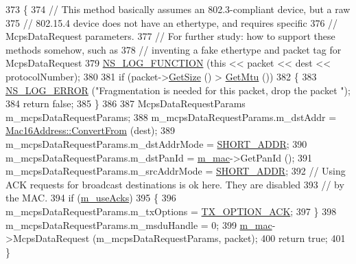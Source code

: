 \begin{DoxyCode}
373 \{
374   \textcolor{comment}{// This method basically assumes an 802.3-compliant device, but a raw}
375   \textcolor{comment}{// 802.15.4 device does not have an ethertype, and requires specific}
376   \textcolor{comment}{// McpsDataRequest parameters.}
377   \textcolor{comment}{// For further study:  how to support these methods somehow, such as}
378   \textcolor{comment}{// inventing a fake ethertype and packet tag for McpsDataRequest}
379   \hyperlink{log-macros-disabled_8h_a90b90d5bad1f39cb1b64923ea94c0761}{NS\_LOG\_FUNCTION} (\textcolor{keyword}{this} << packet << dest << protocolNumber);
380 
381   \textcolor{keywordflow}{if} (packet->\hyperlink{classns3_1_1Packet_a462855c9929954d4301a4edfe55f4f1c}{GetSize} () > \hyperlink{classns3_1_1LrWpanNetDevice_a05677f10efdce98dbb51da4295a2dc95}{GetMtu} ())
382     \{
383       \hyperlink{group__logging_ga0261a8db1d4ac5f79417d117634fd455}{NS\_LOG\_ERROR} (\textcolor{stringliteral}{"Fragmentation is needed for this packet, drop the packet "});
384       \textcolor{keywordflow}{return} \textcolor{keyword}{false};
385     \}
386 
387   McpsDataRequestParams m\_mcpsDataRequestParams;
388   m\_mcpsDataRequestParams.m\_dstAddr = \hyperlink{classns3_1_1Mac16Address_a6822cde696a7be24782dc8e1de2f1449}{Mac16Address::ConvertFrom} (dest);
389   m\_mcpsDataRequestParams.m\_dstAddrMode = \hyperlink{group__lr-wpan_gga9ea4702ab11d5329e1593afebce06bbba7bf58267dde39bdabfeeb5793450c5e3}{SHORT\_ADDR};
390   m\_mcpsDataRequestParams.m\_dstPanId = \hyperlink{classns3_1_1LrWpanNetDevice_a2592ad53fd745035dfdd50ffeb4e4259}{m\_mac}->GetPanId ();
391   m\_mcpsDataRequestParams.m\_srcAddrMode = \hyperlink{group__lr-wpan_gga9ea4702ab11d5329e1593afebce06bbba7bf58267dde39bdabfeeb5793450c5e3}{SHORT\_ADDR};
392   \textcolor{comment}{// Using ACK requests for broadcast destinations is ok here. They are disabled}
393   \textcolor{comment}{// by the MAC.}
394   \textcolor{keywordflow}{if} (\hyperlink{classns3_1_1LrWpanNetDevice_a2e9f71d0b393e1d0030869b2bd7b2ab8}{m\_useAcks})
395     \{
396       m\_mcpsDataRequestParams.m\_txOptions = \hyperlink{group__lr-wpan_gga74ea891230ebf45d80d69a67266930a4a270a37d12b62bb8b5e92d646456244cf}{TX\_OPTION\_ACK};
397     \}
398   m\_mcpsDataRequestParams.m\_msduHandle = 0;
399   \hyperlink{classns3_1_1LrWpanNetDevice_a2592ad53fd745035dfdd50ffeb4e4259}{m\_mac}->McpsDataRequest (m\_mcpsDataRequestParams, packet);
400   \textcolor{keywordflow}{return} \textcolor{keyword}{true};
401 \}
\end{DoxyCode}


